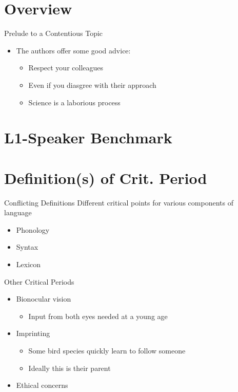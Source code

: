 \documentclass{beamer}
\begin{document}
\section{Overview}

\begin{frame}{Prelude to a Contentious Topic}
  \begin{itemize}
    \item The authors offer some good advice:
    \begin{itemize}
      \item Respect your colleagues
      \item Even if you diasgree with their approach
      \item Science is a laborious process
    \end{itemize}
  \end{itemize}
  
\end{frame}

\section{L1-Speaker Benchmark}

\section{Definition(s) of Crit. Period}

\begin{frame}{Conflicting Definitions}
  Different critical points for various components of language
  \begin{itemize}
    \item Phonology

    \item Syntax

    \item Lexicon
  \end{itemize}
\end{frame}

\begin{frame}{Other Critical Periods}
  \begin{itemize}
    \item Bionocular vision
    \begin{itemize}
      \item Input from both eyes needed at a young age
    \end{itemize}
    \item Imprinting
    \begin{itemize}
      \item Some bird species quickly learn to follow someone
      \item Ideally this is their parent
    \end{itemize}
    \item Ethical concerns
  \end{itemize}
\end{frame}
\end{document}
